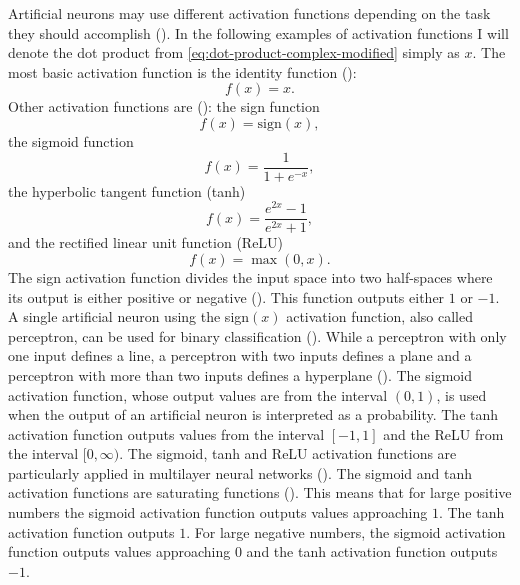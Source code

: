 \documentclass{BachelorBUI}
\begin{document}
                Artificial neurons may use different activation functions depending on the task they should accomplish (\cite{Aggarwal:2018}). In the following examples of activation functions I will denote the dot product from \autoref{eq:dot-product-complex-modified} simply as $x$. The most basic activation function is the identity function (\cite{Aggarwal:2018}):
                \begin{equation}
                    f(x)=x.
                    \label{eq:identity-function}
                \end{equation}
                Other activation functions are (\cite{Aggarwal:2018}): the sign function
                \begin{equation}
                    f(x)=\text{sign}(x),
                    \label{eq:sign-function}
                \end{equation}
                the sigmoid function
                \begin{equation}
                    f(x) = \frac{1}{1 + e^{-x}},
                    \label{eq:sigmoid-function}
                \end{equation}
                the hyperbolic tangent function (tanh)
                \begin{equation}
                     f(x) = \frac{e^{2x}-1}{e^{2x}+1},
                    \label{eq:tanh-function}
                \end{equation}
                and the rectified linear unit function (ReLU)
                \begin{equation}
                    f(x) = \max(0, x).
                    \label{eq:relu-function}
                \end{equation}
                The sign activation function divides the input space into two half-spaces where its output is either positive or negative (\cite{Alpaydin:2014}). This function outputs either $1$ or $-1$. A single artificial neuron using the sign$(x)$ activation function, also called perceptron, can be used for binary classification (\cite{Aggarwal:2018}). While a perceptron with only one input defines a line, a perceptron with two inputs defines a plane and a perceptron with more than two inputs defines a hyperplane (\cite{Alpaydin:2014}). The sigmoid activation function, whose output values are from the interval $(0,1)$, is used when the output of an artificial neuron is interpreted as a probability. The tanh activation function outputs values from the interval $[-1,1]$ and the ReLU from the interval $[0, \infty)$. The sigmoid, tanh and ReLU activation functions are particularly applied in multilayer neural networks (\cite{Alpaydin:2014}). The sigmoid and tanh activation functions are saturating functions (\cite{Murphy:2022}). This means that for large positive numbers the sigmoid activation function outputs values approaching $1$. The tanh activation function outputs $1$. For large negative numbers, the sigmoid activation function outputs values approaching $0$ and the tanh activation function outputs $-1$.
\end{document}
